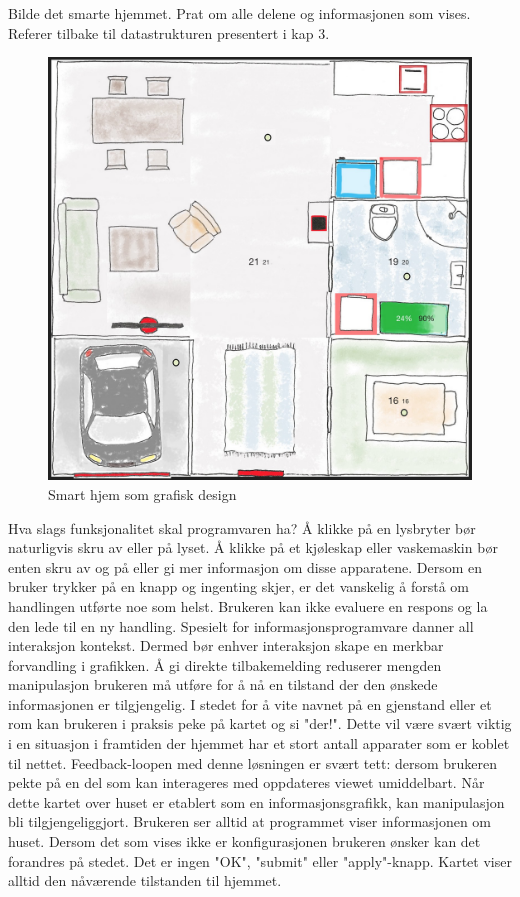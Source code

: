 {\color{red}Bilde det smarte hjemmet. Prat om alle delene og informasjonen som vises. Referer tilbake til datastrukturen presentert i kap 3.}
\begin{figure}
\centering
\includegraphics[scale=0.2]{fig/smarthome}
\caption{Smart hjem som grafisk design}
\label{fig:smarthjemgrafisk}
\end{figure}


Hva slags funksjonalitet skal programvaren ha? Å klikke på en lysbryter bør naturligvis skru av eller på lyset. Å klikke på et kjøleskap eller vaskemaskin bør enten skru av og på eller gi mer informasjon om disse apparatene. Dersom en bruker trykker på en knapp og ingenting skjer, er det vanskelig å forstå om handlingen utførte noe som helst. Brukeren kan ikke evaluere en respons og la den lede til en ny handling. Spesielt for informasjonsprogramvare danner all interaksjon kontekst. Dermed bør enhver interaksjon skape en merkbar forvandling i grafikken. Å gi direkte tilbakemelding reduserer mengden manipulasjon brukeren må utføre for å nå en tilstand der den ønskede informasjonen er tilgjengelig. I stedet for å vite navnet på en gjenstand eller et rom kan brukeren i praksis peke på kartet og si "der!". Dette vil være svært viktig i en situasjon i framtiden der hjemmet har et stort antall apparater som er koblet til nettet. Feedback-loopen med denne løsningen er svært tett: dersom brukeren pekte på en del som kan interageres med oppdateres viewet umiddelbart. Når dette kartet over huset er etablert som en informasjonsgrafikk, kan manipulasjon bli tilgjengeliggjort. Brukeren ser alltid at programmet viser informasjonen om huset. Dersom det som vises ikke er konfigurasjonen brukeren ønsker kan det forandres på stedet. Det er ingen "OK", "submit" eller "apply"-knapp. Kartet viser alltid den nåværende tilstanden til hjemmet.

